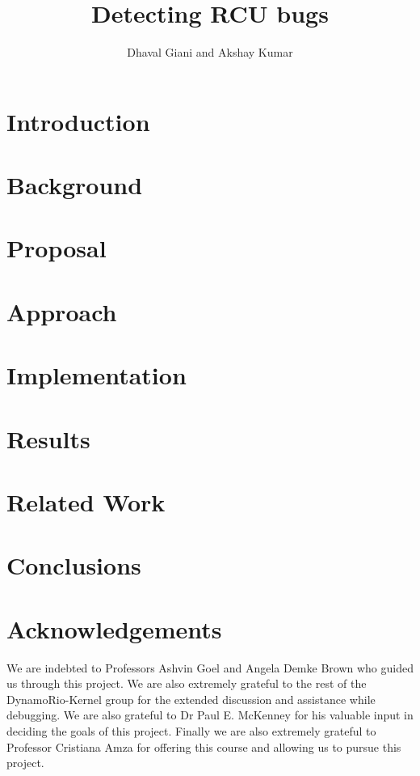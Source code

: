 \documentclass[10pt,twocolumn]{article}
\begin{document}
\title{\bf Detecting RCU bugs}
\author{Dhaval Giani and Akshay Kumar}
\date{}
\maketitle
\thispagestyle{empty}

\lstset{language=C,basicstyle=\ttfamily,tabsize=4, columns=fullflexible}
\begin{abstract}

\end{abstract}

\section{Introduction}\label{sec:intro}


\section{Background}\label{sec:back}


\section{Proposal}\label{sec:proposal}


\section{Approach}\label{sec:appr}


\section{Implementation}\label{sec:impl}


\section{Results}\label{sec:results}


\section{Related Work}\label{sec:related}


\section{Conclusions}\label{sec:conclusions}


\section{Acknowledgements}
We are indebted to Professors Ashvin Goel and Angela Demke Brown who
guided us through this project. We are also extremely grateful to the
rest of the DynamoRio-Kernel group for the extended discussion and
assistance while debugging. We are also grateful to Dr Paul E. McKenney
for his valuable input in deciding the goals of this project. Finally
we are also extremely grateful to Professor Cristiana Amza for offering
this course and allowing us to pursue this project.


 
\end{document}
